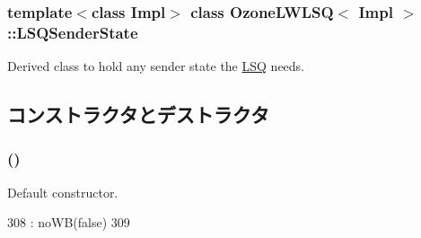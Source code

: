 \subsubsection*{template$<$class Impl$>$ class OzoneLWLSQ$<$ Impl $>$::LSQSenderState}

Derived class to hold any sender state the \hyperlink{classLSQ}{LSQ} needs. 

\subsection{コンストラクタとデストラクタ}
\hypertarget{classOzoneLWLSQ_1_1LSQSenderState_a0f4caf0593be7a2d809d7335984820d2}{
\subsubsection[{LSQSenderState}]{ ()}}
\label{classOzoneLWLSQ_1_1LSQSenderState_a0f4caf0593be7a2d809d7335984820d2}
Default constructor. 


\begin{DoxyCode}
308             : noWB(false)
309         { }
\end{DoxyCode}


